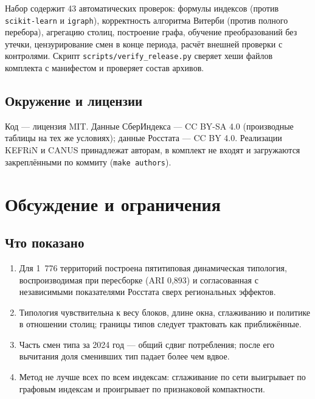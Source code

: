 \documentclass[11pt,a4paper]{article}
\providecommand{\tightlist}{\setlength{\itemsep}{1pt}\setlength{\parskip}{0pt}}
\begin{document}
Набор содержит 43 автоматических проверок: формулы индексов (против \texttt{scikit-\allowbreak{}learn} и \texttt{igraph}), корректность алгоритма Витерби (против полного перебора), агрегацию столиц, построение графа, обучение преобразований без утечки, цензурирование смен в конце периода, расчёт внешней проверки с контролями. Скрипт \texttt{scripts/\allowbreak{}verify\_\allowbreak{}release.\allowbreak{}py} сверяет хеши файлов комплекта с манифестом и проверяет состав архивов.

\subsection{Окружение и лицензии}\label{ux43eux43aux440ux443ux436ux435ux43dux438ux435-ux438-ux43bux438ux446ux435ux43dux437ux438ux438}

Код --- лицензия MIT. Данные СберИндекса --- CC BY-SA 4.0 (производные таблицы на тех же условиях); данные Росстата --- CC BY 4.0. Реализации KEFRiN и CANUS принадлежат авторам, в комплект не входят и загружаются закреплёнными по коммиту (\texttt{make authors}).

\section{Обсуждение и ограничения}\label{ux43eux431ux441ux443ux436ux434ux435ux43dux438ux435-ux438-ux43eux433ux440ux430ux43dux438ux447ux435ux43dux438ux44f}

\subsection{Что показано}\label{ux447ux442ux43e-ux43fux43eux43aux430ux437ux430ux43dux43e}

\begin{enumerate}
\def\labelenumi{\arabic{enumi}.}
\tightlist
\item
  Для 1~776 территорий построена пятитиповая динамическая типология, воспроизводимая при пересборке (ARI 0,893) и согласованная с независимыми показателями Росстата сверх региональных эффектов.
\item
  Типология чувствительна к весу блоков, длине окна, сглаживанию и политике в отношении столиц; границы типов следует трактовать как приближённые.
\item
  Часть смен типа за 2024 год --- общий сдвиг потребления; после его вычитания доля сменивших тип падает более чем вдвое.
\item
  Метод не лучше всех по всем индексам: сглаживание по сети выигрывает по графовым индексам и проигрывает по признаковой компактности.
\end{enumerate}
\end{document}
